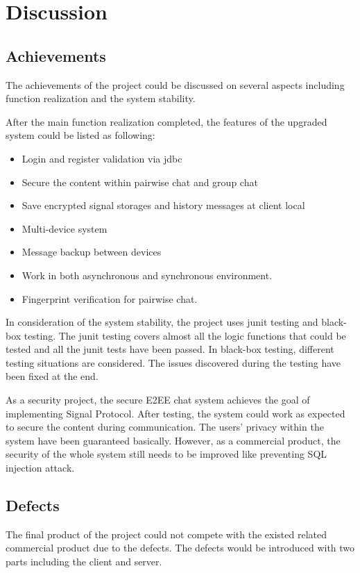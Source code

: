 \section{Discussion}

\subsection{Achievements}
The achievements of the project could be discussed on several aspects including function realization and the system stability.

After the main function realization completed, the features of the upgraded system could be listed as following:

\begin{itemize}
\item Login and register validation via jdbc
\item Secure the content within pairwise chat and group chat
\item Save encrypted signal storages and history messages at client local
\item Multi-device system
\item Message backup between devices
\item Work in both asynchronous and synchronous environment.
\item Fingerprint verification for pairwise chat.
\end{itemize}

In consideration of the system stability, the project uses junit testing and black-box testing. The junit testing covers almost all the logic functions that could be tested and all the junit tests have been passed. In black-box testing, different testing situations are considered. The issues discovered during the testing have been fixed at the end.

As a security project, the secure E2EE chat system achieves the goal of implementing Signal Protocol. After testing, the system could work as expected to secure the content during communication. The users' privacy within the system have been guaranteed basically. However, as a commercial product, the security of the whole system still needs to be improved like preventing SQL injection attack.

\subsection{Defects}
The final product of the project could not compete with the existed related commercial product due to the defects. The defects would be introduced with two parts including the client and server.

